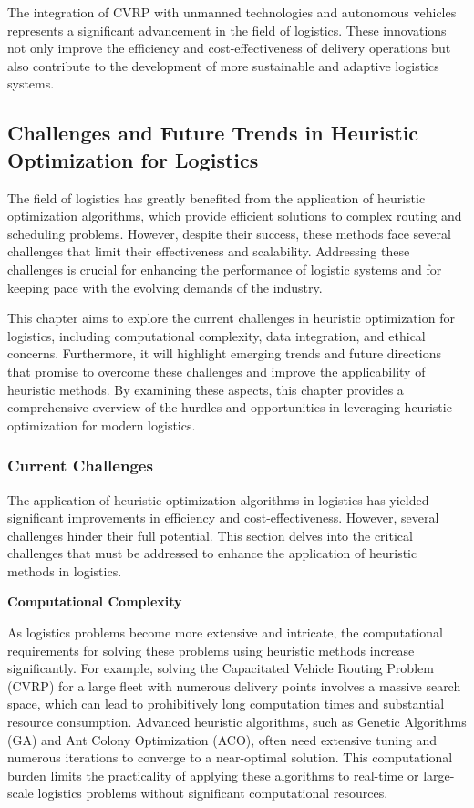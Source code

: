\documentclass{article}
\begin{document}
    The integration of CVRP with unmanned technologies and autonomous vehicles represents a significant advancement in the field of logistics. These innovations not only improve the efficiency and cost-effectiveness of delivery operations but also contribute to the development of more sustainable and adaptive logistics systems.

    \newpage

    \subsection{Challenges and Future Trends in Heuristic Optimization for Logistics}\label{sec:challenges-and-future-trends-in-heuristic-optimization-for-logistics}

    The field of logistics has greatly benefited from the application of heuristic optimization algorithms, which provide efficient solutions to complex routing and scheduling problems. However, despite their success, these methods face several challenges that limit their effectiveness and scalability. Addressing these challenges is crucial for enhancing the performance of logistic systems and for keeping pace with the evolving demands of the industry.

    This chapter aims to explore the current challenges in heuristic optimization for logistics, including computational complexity, data integration, and ethical concerns. Furthermore, it will highlight emerging trends and future directions that promise to overcome these challenges and improve the applicability of heuristic methods. By examining these aspects, this chapter provides a comprehensive overview of the hurdles and opportunities in leveraging heuristic optimization for modern logistics.

    \subsubsection{Current Challenges}\label{subsec:current-challenges}

    The application of heuristic optimization algorithms in logistics has yielded significant improvements in efficiency and cost-effectiveness. However, several challenges hinder their full potential. This section delves into the critical challenges that must be addressed to enhance the application of heuristic methods in logistics.

    \textbf{Computational Complexity}

    As logistics problems become more extensive and intricate, the computational requirements for solving these problems using heuristic methods increase significantly. For example, solving the Capacitated Vehicle Routing Problem (CVRP) for a large fleet with numerous delivery points involves a massive search space, which can lead to prohibitively long computation times and substantial resource consumption. Advanced heuristic algorithms, such as Genetic Algorithms (GA) and Ant Colony Optimization (ACO), often need extensive tuning and numerous iterations to converge to a near-optimal solution. This computational burden limits the practicality of applying these algorithms to real-time or large-scale logistics problems without significant computational resources.
\end{document}
